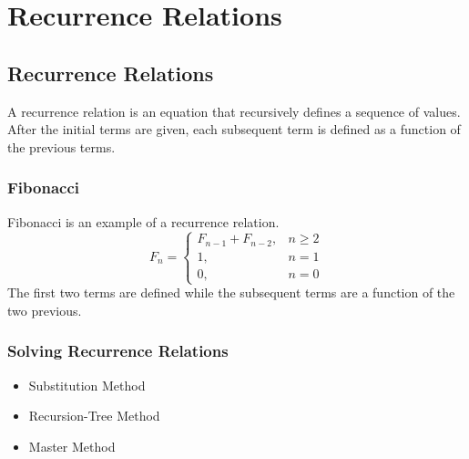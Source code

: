 \chapter{Recurrence Relations}

\section{Recurrence Relations}
A recurrence relation is an equation that recursively defines a sequence of values. After the initial terms are given, each subsequent term is defined as a function of the previous terms.

\subsection{Fibonacci}
Fibonacci is an example of a recurrence relation.
$$
F_n = \begin{cases}
	F_{n-1} + F_{n-2}, &  n \geq 2\\
	1, & n = 1\\
	0, & n = 0
\end{cases}
$$
The first two terms are defined while the subsequent terms are a function of the two previous.

\subsection{Solving Recurrence Relations}
\begin{itemize}
	\item Substitution Method
	\item Recursion-Tree Method
	\item Master Method
\end{itemize}

